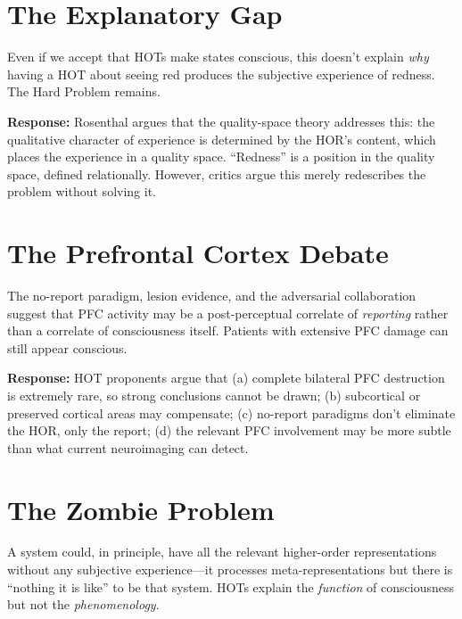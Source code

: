 \documentclass[11pt,a4paper]{report}
\begin{document}
\section{The Explanatory Gap}

\begin{objbox}
Even if we accept that HOTs make states conscious, this doesn't explain \emph{why} having a HOT about seeing red produces the subjective experience of redness. The Hard Problem remains.
\end{objbox}

\textbf{Response:} Rosenthal argues that the quality-space theory addresses this: the qualitative character of experience is determined by the HOR's content, which places the experience in a quality space. ``Redness'' is a position in the quality space, defined relationally. However, critics argue this merely redescribes the problem without solving it.

\section{The Prefrontal Cortex Debate}

\begin{objbox}
The no-report paradigm, lesion evidence, and the adversarial collaboration suggest that PFC activity may be a post-perceptual correlate of \emph{reporting} rather than a correlate of consciousness itself. Patients with extensive PFC damage can still appear conscious.
\end{objbox}

\textbf{Response:} HOT proponents argue that (a) complete bilateral PFC destruction is extremely rare, so strong conclusions cannot be drawn; (b) subcortical or preserved cortical areas may compensate; (c) no-report paradigms don't eliminate the HOR, only the report; (d) the relevant PFC involvement may be more subtle than what current neuroimaging can detect.

\section{The Zombie Problem}

\begin{objbox}
A system could, in principle, have all the relevant higher-order representations without any subjective experience---it processes meta-representations but there is ``nothing it is like'' to be that system. HOTs explain the \emph{function} of consciousness but not the \emph{phenomenology}.
\end{objbox}
\end{document}
